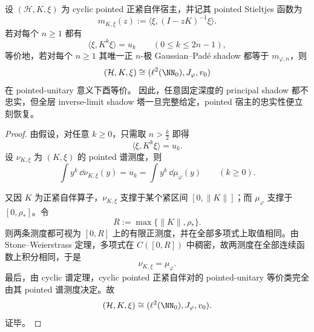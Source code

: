 \begin{theorem}\label{thm:conclusion-principal-shadow-inverse-limit-pointed-rigidity}
设 \((\mathcal H,K,\xi)\) 为 cyclic pointed 正紧自伴宿主，并记其 pointed Stieltjes 函数为
\[
m_{K,\xi}(z):=\langle \xi,(I-zK)^{-1}\xi\rangle.
\]
若对每个 \(n\ge 1\) 都有
\[
\langle \xi,K^k\xi\rangle=u_k
\qquad (0\le k\le 2n-1),
\]
等价地，若对每个 \(n\ge 1\) 其唯一正 \(n\)-极 Gaussian--Pad\'e shadow 都等于 \(m_{\varphi,n}\)，则
\[
(\mathcal H,K,\xi)\cong (\ell^2(\NN_0),J_\varphi,v_0)
\]
在 pointed-unitary 意义下酉等价。
因此，任意固定深度的 principal shadow 都不忠实，但全层 inverse-limit shadow 塔一旦完整给定，pointed 宿主的忠实性便立刻恢复。
\end{theorem}
\begin{proof}
由假设，对任意 \(k\ge 0\)，只需取 \(n>\frac{k}{2}\) 即得
\[
\langle \xi,K^k\xi\rangle=u_k.
\]
设 \(\nu_{K,\xi}\) 为 \((K,\xi)\) 的 pointed 谱测度，则
\[
\int y^k\,\dd\nu_{K,\xi}(y)=u_k=\int y^k\,\dd\mu_\varphi(y)
\qquad (k\ge 0).
\]

又因 \(K\) 为正紧自伴算子，\(\nu_{K,\xi}\) 支撑于某个紧区间 \([0,\|K\|]\)；而 \(\mu_\varphi\) 支撑于 \([0,\rho_\ast]\)。令
\[
R:=\max\{\|K\|,\rho_\ast\}.
\]
则两条测度都可视为 \([0,R]\) 上的有限正测度，并在全部多项式上取值相同。由 Stone--Weierstrass 定理，多项式在 \(C([0,R])\) 中稠密，故两测度在全部连续函数上积分相同，于是
\[
\nu_{K,\xi}=\mu_\varphi.
\]
最后，由 cyclic 谱定理，cyclic pointed 正紧自伴对的 pointed-unitary 等价类完全由其 pointed 谱测度决定。故
\[
(\mathcal H,K,\xi)\cong (\ell^2(\NN_0),J_\varphi,v_0).
\]
证毕。
\end{proof}

